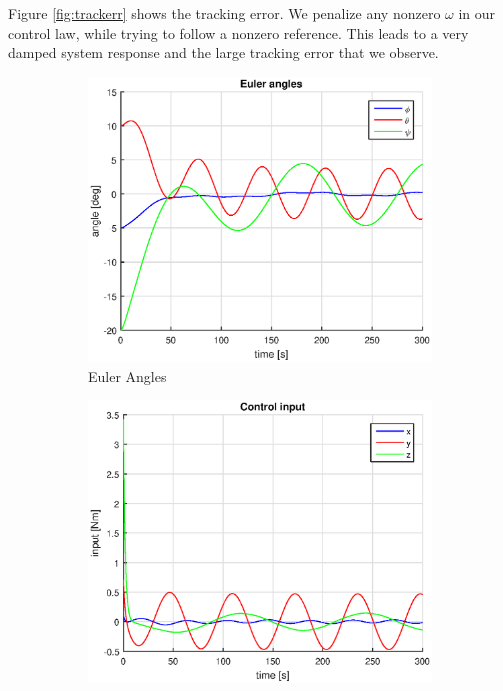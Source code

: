 Figure \ref{fig:trackerr} shows the tracking error. We penalize any nonzero $\omega$ in our control law, while trying to follow a nonzero reference. This leads to a very damped system response and the large tracking error that we observe.

\begin{figure}[h]
    \centering
    \begin{subfigure}[b]{0.45\textwidth}
        \includegraphics[width=\textwidth]{plots/euler_angles_155.eps}
        \caption{Euler Angles}
        \label{fig:euler5}
    \end{subfigure}
    \begin{subfigure}[b]{0.45\textwidth}
        \includegraphics[width=\textwidth]{plots/control_input_155.eps}

\end{subfigure}
\end{figure}
